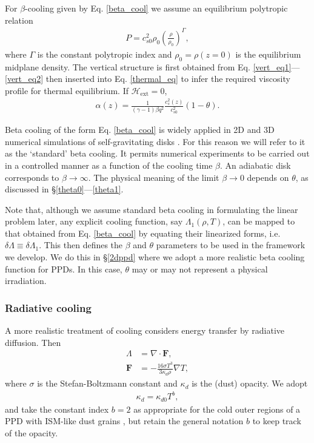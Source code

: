 For $\beta$-cooling given by Eq. \ref{beta_cool} we assume an 
equilibrium polytropic relation 
\begin{align} 
  P  =
c_{s0}^2\rho_0\left(\frac{\rho}{\rho_0}\right)^\Gamma,
\end{align}
where $\Gamma$ is the constant polytropic index and $\rho_0 =
\rho(z=0)$ is the equilibrium midplane density. 
The vertical structure is first obtained from
Eq. \ref{vert_eq1}---\ref{vert_eq2} then inserted into
Eq. \ref{thermal_eq} to infer the required viscosity profile for
thermal equilibrium. If  $\mathcal{H}_\mathrm{ext}=0$, 
\begin{align}\label{alpha_beta_relation}
\alpha(z) = \frac{1}{(\gamma-1)\beta
   q^2}\frac{c_s^2(z)}{c_{s0}^2}\left(1 - \theta\right). 
\end{align}

Beta cooling of the form Eq. \ref{beta_cool} is widely applied in 2D
and 3D numerical simulations of self-gravitating disks \citep{gammie01,
  rice05,rice11}. For this reason we will refer to it as the
`standard' beta cooling. It permits numerical experiments to be
carried out in a controlled manner as a function of the cooling time
$\beta$. An adiabatic disk corresponds to $\beta\to \infty$. The
physical meaning of the limit $\beta\to0$ depends on $\theta$, as
discussed in \S\ref{theta0}---\ref{theta1}.  

Note that, although we assume standard beta cooling in formulating the
linear problem later, any explicit 
cooling function, say $\Lambda_1(\rho,T)$, can be mapped to
that obtained from Eq. \ref{beta_cool} by equating their linearized
forms, i.e. $\delta \Lambda \equiv \delta \Lambda_1$. This then 
defines the $\beta$ and $\theta$ parameters to be used in the 
framework we develop. We do this in \S\ref{2dppd} where we adopt a
more realistic beta cooling function for PPDs. In this case, $\theta$
may or may not represent a physical irradiation.     

\subsubsection{Radiative cooling}\label{rad_cool}
A more realistic treatment of cooling considers energy transfer by radiative diffusion. Then
\begin{align}
  \Lambda &= \nabla\cdot\bm{F},\label{rad_cool1}\\
  \bm{F}   &= -\frac{16\sigma T^3}{3\kappa_d\rho}\nabla T, \label{rad_cool2}
\end{align}
where $\sigma$ is the Stefan-Boltzmann constant and 
$\kappa_d$ is the (dust) opacity. We adopt
\begin{align}\label{opacity_law}
  \kappa_d = \kappa_{d0}T^b,
\end{align}
and take the constant index $b=2$ as appropriate for the cold outer regions
of a PPD with ISM-like dust grains \citep{bell94}, but retain the general notation $b$
to keep track of the opacity.    

